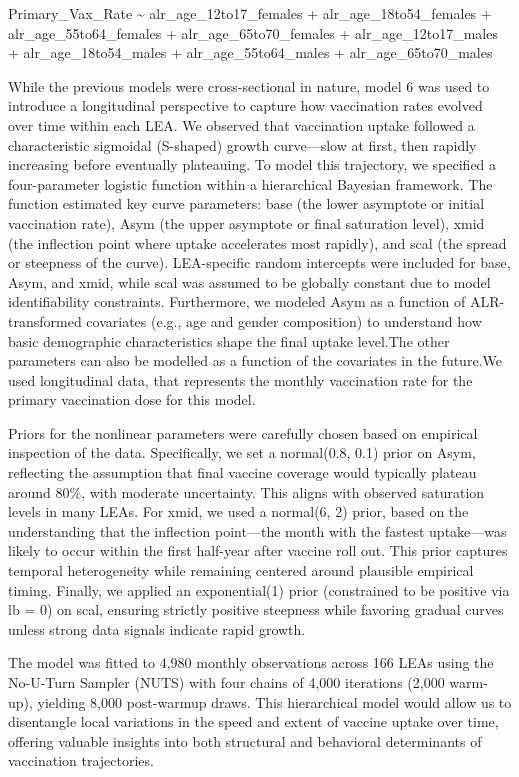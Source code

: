 \documentclass{article}
\begin{document}
Primary\_Vax\_Rate \textasciitilde{} alr\_age\_12to17\_females +
alr\_age\_18to54\_females + alr\_age\_55to64\_females +
alr\_age\_65to70\_females + alr\_age\_12to17\_males +
alr\_age\_18to54\_males + alr\_age\_55to64\_males +
alr\_age\_65to70\_males

While the previous models were cross-sectional in nature, model 6 was
used to introduce a longitudinal perspective to capture how vaccination
rates evolved over time within each LEA. We observed that vaccination
uptake followed a characteristic sigmoidal (S-shaped) growth
curve---slow at first, then rapidly increasing before eventually
plateauing. To model this trajectory, we specified a four-parameter
logistic function within a hierarchical Bayesian framework. The function
estimated key curve parameters: base (the lower asymptote or initial
vaccination rate), Asym (the upper asymptote or final saturation level),
xmid (the inflection point where uptake accelerates most rapidly), and
scal (the spread or steepness of the curve). LEA-specific random
intercepts were included for base, Asym, and xmid, while scal was
assumed to be globally constant due to model identifiability
constraints. Furthermore, we modeled Asym as a function of
ALR-transformed covariates (e.g., age and gender composition) to
understand how basic demographic characteristics shape the final uptake
level.The other parameters can also be modelled as a function of the
covariates in the future.We used longitudinal data, that represents the
monthly vaccination rate for the primary vaccination dose for this
model.

Priors for the nonlinear parameters were carefully chosen based on
empirical inspection of the data. Specifically, we set a normal(0.8,
0.1) prior on Asym, reflecting the assumption that final vaccine
coverage would typically plateau around 80\%, with moderate uncertainty.
This aligns with observed saturation levels in many LEAs. For xmid, we
used a normal(6, 2) prior, based on the understanding that the
inflection point---the month with the fastest uptake---was likely to
occur within the first half-year after vaccine roll out. This prior
captures temporal heterogeneity while remaining centered around
plausible empirical timing. Finally, we applied an exponential(1) prior
(constrained to be positive via lb = 0) on scal, ensuring strictly
positive steepness while favoring gradual curves unless strong data
signals indicate rapid growth.

The model was fitted to 4,980 monthly observations across 166 LEAs using
the No-U-Turn Sampler (NUTS) with four chains of 4,000 iterations (2,000
warm-up), yielding 8,000 post-warmup draws. This hierarchical model
would allow us to disentangle local variations in the speed and extent
of vaccine uptake over time, offering valuable insights into both
structural and behavioral determinants of vaccination trajectories.
\end{document}
